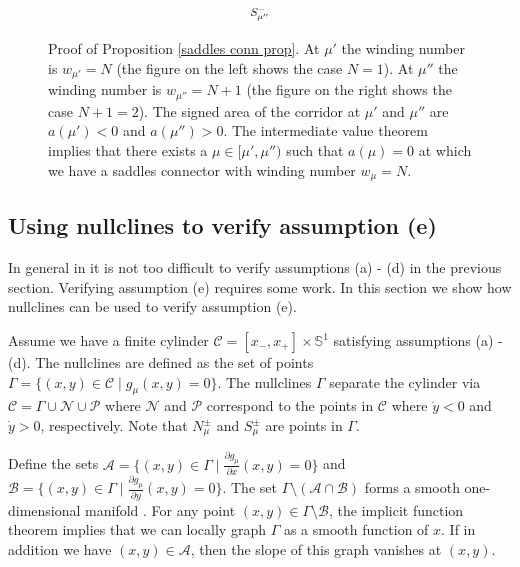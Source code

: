 \documentclass[11 pt]{article}
\renewcommand\({\left(}
\renewcommand\){\right)}
\newcommand\<{\langle}
\renewcommand\>{\rangle}
\newcommand\8{\infty}
\newcommand{\pd}{\partial}
\newcommand{\mc}{\mathcal}
\newcommand{\Sset}{\mathbb{S}}
\begin{document}
\begin{figure}[h]
\[\begin{tikzpicture}[scale = 0.55]
\draw (-0.8,5) node [scale = .8] {$S^-_{\mu''}$};










\end{tikzpicture}
\]
\captionsetup{format=hang}
\caption{\small{Proof of Proposition \ref{saddles conn prop}. At $\mu'$ the winding number is $w_{\mu'} = N$ (the figure on the left shows the case $N = 1$). At $\mu''$ the winding number is $w_{\mu''} = N + 1$ (the figure on the right shows the case $N + 1 = 2$). The signed area of the corridor at $\mu'$ and $\mu''$ are $a(\mu') < 0$ and $a(\mu'') > 0$. The intermediate value theorem implies that there exists a $\mu \in [\mu', \mu'')$ such that $a(\mu) = 0$ at which we have a saddles connector with winding number $w_\mu = N$.  }}
\end{figure}


\medskip
\medskip

\subsection{Using nullclines to verify assumption (e)}

\medskip

In general in it is not too difficult to verify assumptions (a) - (d) in the previous section. Verifying assumption (e) requires some work. In this section we show how nullclines can be used to verify assumption (e). 

Assume we have a finite cylinder $\mc{C} = [x_-, x_+] \times \Sset^1$ satisfying assumptions (a) - (d). The nullclines are defined as the set of points $\Gamma = \big\{(x, y) \in \mc{C} \mid g_\mu(x, y) = 0\big\}$. The nullclines $\Gamma$ separate the cylinder via $\mc{C} = \Gamma \cup \mc{N} \cup \mc{P}$ where $\mc{N}$ and $\mc{P}$ correspond to the points in $\mc{C}$ where $\dot{y} < 0$ and $\dot{y} > 0$, respectively. Note that $N^\pm_\mu$ and $S^\pm_\mu$ are points in $\Gamma$.
 
 Define the sets $\mc{A} = \big\{(x,y) \in \Gamma \mid \frac{\pd g_\mu}{\pd x}(x, y) = 0 \big\}$ and $\mc{B} = \big\{(x, y) \in \Gamma \mid \frac{\pd g_\mu}{\pd y}(x, y) = 0\big\}$. The set $\Gamma \setminus (\mc{A} \cap \mc{B})$ forms a smooth one-dimensional manifold \cite[page 20]{LeeSmoothMan}.  For any point $(x,y) \in \Gamma \setminus \mc{B}$, the implicit function theorem implies that we can locally graph $\Gamma$ as a smooth function of $x$. If in addition we have $(x,y) \in \mc{A}$, then the slope of this graph vanishes at $(x,y)$. 
 
\end{document}
